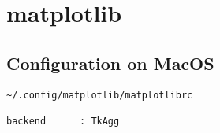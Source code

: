 \section{matplotlib}


\subsection{Configuration on MacOS}

\begin{verbatim}
~/.config/matplotlib/matplotlibrc

backend      : TkAgg 
\end{verbatim}

